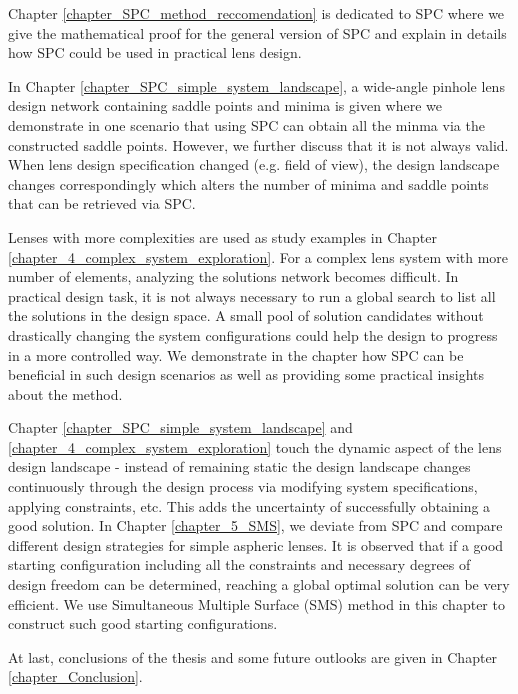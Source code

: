 Chapter \ref{chapter_SPC_method_reccomendation} is dedicated to SPC where we give the mathematical proof for the general version of SPC and explain in details how SPC could be used in practical lens design. 

In Chapter \ref{chapter_SPC_simple_system_landscape}, a wide-angle pinhole lens design network containing saddle points and minima is given where we demonstrate in one scenario that using SPC can obtain all the minma via the constructed saddle points. However, we further discuss that it is not always valid. When lens design specification changed (e.g. field of view), the design landscape changes correspondingly which alters the number of minima and saddle points that can be retrieved via SPC.  

Lenses with more complexities are used as study examples in Chapter \ref{chapter_4_complex_system_exploration}. For a complex lens system with more number of elements, analyzing the solutions network becomes difficult. In practical design task, it is not always necessary to run a global search to list all the solutions in the design space. A small pool of solution candidates without drastically changing the system configurations could help the design to progress in a more controlled way. We demonstrate in the chapter how SPC can be beneficial in such design scenarios as well as providing some practical insights about the method. 

Chapter \ref{chapter_SPC_simple_system_landscape} and \ref{chapter_4_complex_system_exploration} touch the dynamic aspect of the lens design landscape - instead of remaining static the design landscape changes continuously through the design process via modifying system specifications, applying constraints, etc. This adds the uncertainty of successfully obtaining a good solution.  In Chapter \ref{chapter_5_SMS}, we deviate from SPC and compare different design strategies for simple aspheric lenses. It is observed that if a good starting configuration including all the constraints and necessary degrees of design freedom can be determined, reaching a global optimal solution can be very efficient. We use Simultaneous Multiple Surface (SMS) method in this chapter to construct such good starting configurations. 

At last, conclusions of the thesis and some future outlooks are given in Chapter \ref{chapter_Conclusion}.


